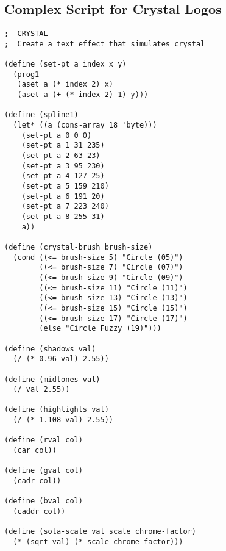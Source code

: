 \documentclass{article}
\begin{document}
\subsection{Complex Script for Crystal Logos}

{\scriptsize
\begin{verbatim}
;  CRYSTAL
;  Create a text effect that simulates crystal

(define (set-pt a index x y)
  (prog1
   (aset a (* index 2) x)
   (aset a (+ (* index 2) 1) y)))

(define (spline1)
  (let* ((a (cons-array 18 'byte)))
    (set-pt a 0 0 0)
    (set-pt a 1 31 235)
    (set-pt a 2 63 23)
    (set-pt a 3 95 230)
    (set-pt a 4 127 25)
    (set-pt a 5 159 210)
    (set-pt a 6 191 20)
    (set-pt a 7 223 240)
    (set-pt a 8 255 31)
    a))

(define (crystal-brush brush-size)
  (cond ((<= brush-size 5) "Circle (05)")
        ((<= brush-size 7) "Circle (07)")
        ((<= brush-size 9) "Circle (09)")
        ((<= brush-size 11) "Circle (11)")
        ((<= brush-size 13) "Circle (13)")
        ((<= brush-size 15) "Circle (15)")
        ((<= brush-size 17) "Circle (17)")
        (else "Circle Fuzzy (19)")))

(define (shadows val)
  (/ (* 0.96 val) 2.55))

(define (midtones val)
  (/ val 2.55))

(define (highlights val)
  (/ (* 1.108 val) 2.55))

(define (rval col)
  (car col))

(define (gval col)
  (cadr col))

(define (bval col)
  (caddr col))

(define (sota-scale val scale chrome-factor)
  (* (sqrt val) (* scale chrome-factor)))


\end{verbatim}}
\end{document}
